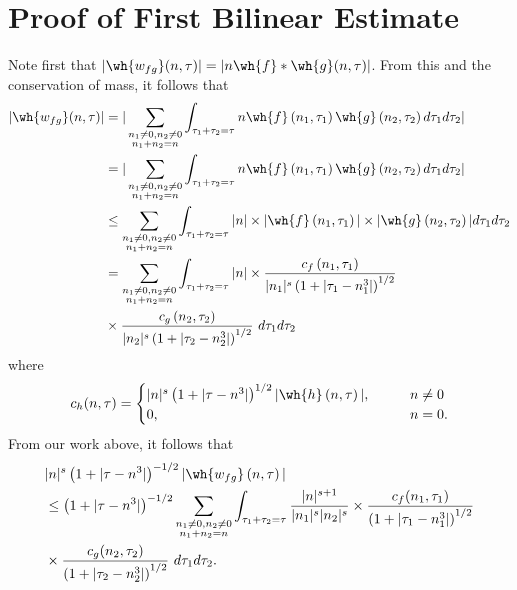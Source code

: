 \section{Proof of First Bilinear Estimate}
Note first that $|\wh{w_{fg}}(n, \tau) |  = | n\wh{f} *  \wh{g} 
(n, \tau)|$. From this and the conservation of mass, it follows that
%
%
\begin{equation}
	\label{2non-lin-rep}
	\begin{split}
		| \wh{w_{fg}}(n, \tau)|
		& = | \sum_{\substack{n_1 \neq 0, n_2 \neq 0 \\n_1 +n_2 =n}}  \int_{\tau_1 + \tau_2 = \tau}n\wh{f}\left( n_1,  \tau_1 
\right) \wh{g}\left( n_2, \tau_2  
\right) d \tau_1 d \tau_2 |
\\
& = | \sum_{\substack{n_1 \neq0, n_2 \neq 0 \\n_1 + n_2 =n}}  \int_{\tau_1 + \tau_2 = \tau}n\wh{f}\left( n_1,  \tau_1 
\right) \wh{g}\left( n_2, \tau_2  
\right) d \tau_1 d \tau_2 | 
\\
& \le \sum_{\substack{n_1 \neq0, n_2 \neq 0 \\n_1 + n_2 =n}}   \int_{\tau_1 + \tau_2 = \tau}| n | \times | \wh{f}\left( n_1, \tau_1 
\right) | \times  | \wh{g}\left( n_2, \tau_2 
\right) |   d \tau_1 d \tau_2  
\\
& = \sum_{\substack{n_1 \neq0, n_2 \neq 0 \\n_1 + n_2 =n}} \int_{\tau_1 + \tau_2 = \tau}| n | \times \frac{c_f\left( n_1, \tau_1 
\right)}{|n_1|^s \left( 1 + | \tau_1 - n_1^3 | \right)^{1/2}}
\\
& \times \frac{c_{g}\left( n_2, \tau_2 \right)}{|n_2|^s\left( 1 + | \tau_2 -  n_2^3| 
\right)^{1/2}}
  \ d \tau_1 d \tau_2 
\end{split}
\end{equation}
%
%
where 
%
%
\begin{equation*}
	\begin{split}
		c_h(n, \tau) =
		\begin{cases}
			|n|^s \left( 1 + | \tau - n^3 |  
			\right)^{1/2} | \wh{h}\left( n, \tau \right) |, \qquad & n \neq 0
		\\
		0, \qquad & n = 0.
	\end{cases}
	\end{split}
\end{equation*}
%
%
From our work above, it follows that 
%
%
\begin{equation}
	\label{2convo-est-starting-pnt}
	\begin{split}
		 & |n|^s \left( 1 + | \tau - n^3 | \right)^{-1/2} | \wh{w_{fg}}\left( 
		n, \tau \right) |
		\\
		& \le \left( 1 + | \tau - n^3 | \right)^{-1/2}
		\sum_{\substack{n_1 \neq0, n_2 \neq 0 \\n_1 + n_2 =n}} \int_{\tau_1 + \tau_2 = \tau}\frac{|n|^{s+1}}{|n_1|^s | n_2|^s} 
		\times \frac{c_f(n_1, \tau_1)}{\left( 1 + | \tau_1 - n_1^3 | 
		\right)^{1/2}}
		\\
		& \times
		\frac{c_g(n_2, \tau_2)}{\left( 1 + | \tau_2 - n_2^3 | 
		\right)^{1/2}}\ d \tau_1 d \tau_2.
	\end{split}
\end{equation}
